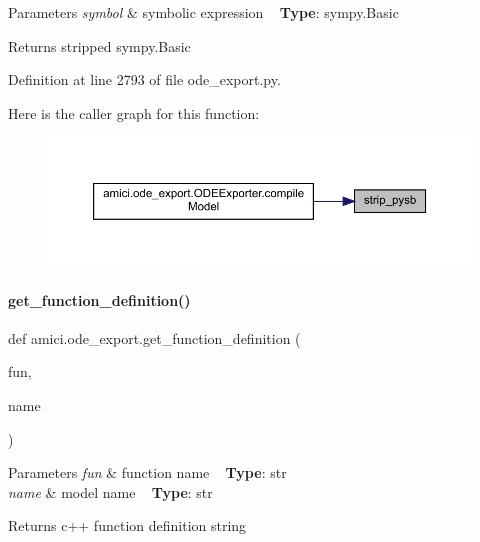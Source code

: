 \begin{DoxyParams}{Parameters}
{\em symbol} & symbolic expression ~\newline
{\bfseries{Type}}\+: sympy.\+Basic\\
\hline
\end{DoxyParams}
\begin{DoxyReturn}{Returns}
stripped sympy.\+Basic 
\end{DoxyReturn}


Definition at line 2793 of file ode\+\_\+export.\+py.

Here is the caller graph for this function\+:
\nopagebreak
\begin{figure}[H]
\begin{center}
\leavevmode
\includegraphics[width=350pt]{namespaceamici_1_1ode__export_ad632f77725600e4f03e996f4dd88f361_icgraph}
\end{center}
\end{figure}
\mbox{\label{namespaceamici_1_1ode__export_a128fdb36a0dd6b83a170543ff04659e0}} 
\paragraph{\texorpdfstring{get\_function\_definition()}{get\_function\_definition()}}
{\footnotesize\ttfamily def amici.\+ode\+\_\+export.\+get\+\_\+function\+\_\+definition (\begin{DoxyParamCaption}\item[{}]{fun,  }\item[{}]{name }\end{DoxyParamCaption})}


\begin{DoxyParams}{Parameters}
{\em fun} & function name ~\newline
{\bfseries{Type}}\+: str \\
\hline
{\em name} & model name ~\newline
{\bfseries{Type}}\+: str\\
\hline
\end{DoxyParams}
\begin{DoxyReturn}{Returns}
c++ function definition string 
\end{DoxyReturn}


